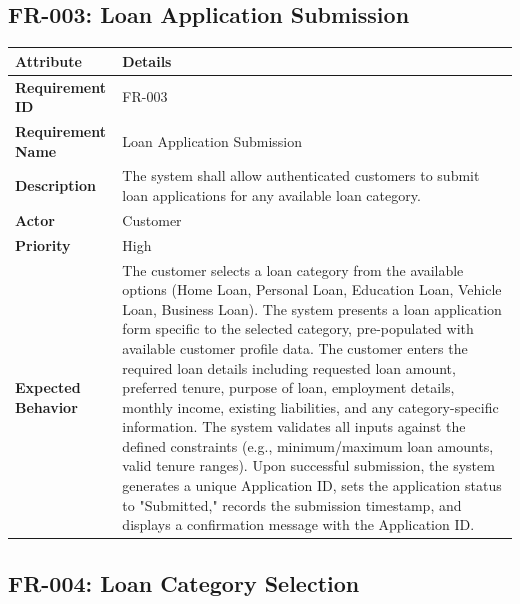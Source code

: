 \documentclass[12pt,a4paper,oneside]{report}
\begin{document}
\subsection{FR-003: Loan Application Submission}

\begin{table}[htbp]
\centering
\small
\begin{tabularx}{\textwidth}{l l}
\toprule
\textbf{Attribute} & \textbf{Details} \\
\midrule
\textbf{Requirement ID} & FR-003 \\
\textbf{Requirement Name} & Loan Application Submission \\
\textbf{Description} & The system shall allow authenticated customers to submit loan applications for any available loan category. \\
\textbf{Actor} & Customer \\
\textbf{Priority} & High \\
\textbf{Expected Behavior} & The customer selects a loan category from the available options (Home Loan, Personal Loan, Education Loan, Vehicle Loan, Business Loan). The system presents a loan application form specific to the selected category, pre-populated with available customer profile data. The customer enters the required loan details including requested loan amount, preferred tenure, purpose of loan, employment details, monthly income, existing liabilities, and any category-specific information. The system validates all inputs against the defined constraints (e.g., minimum/maximum loan amounts, valid tenure ranges). Upon successful submission, the system generates a unique Application ID, sets the application status to "Submitted," records the submission timestamp, and displays a confirmation message with the Application ID. \\
\bottomrule
\end{tabularx}
\end{table}

\subsection{FR-004: Loan Category Selection}
\end{document}
